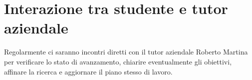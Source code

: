 \section*{Interazione tra studente e tutor aziendale}

Regolarmente ci saranno incontri diretti con il tutor aziendale Roberto Martina per verificare lo stato di avanzamento, 
chiarire eventualmente gli obiettivi, affinare la ricerca e aggiornare il piano stesso di lavoro.